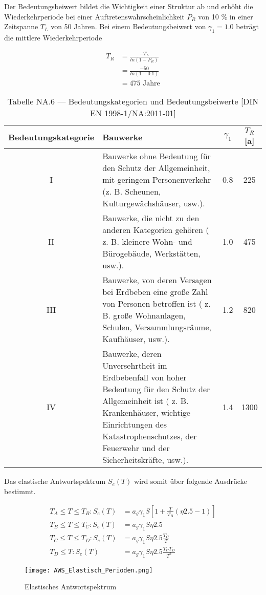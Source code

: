 \pagebreak

Der Bedeutungsbeiwert bildet die Wichtigkeit einer Struktur ab und erhöht die Wiederkehrperiode bei einer Auftretenswahrscheinlichkeit $P_R$ von 10 \% in einer Zeitspanne $T_L$ von 50 Jahren.
Bei einem Bedeutungsbeiwert von $\gamma_1 = 1.0$ beträgt die mittlere Wiederkehrperiode

\begin{align*}
T_R &= \frac{-T_L}{ln(1 - P_R)}\\
    &= \frac{-50}{ln(1 - 0.1)}\\
    &=  475 \mbox{ Jahre}
\end{align*}

\begin{table}[H]
\centering
\begin{tabular}{ |c|p{7cm}|c|c| } 
 \hline
 Bedeutungskategorie & Bauwerke & $\gamma_1$ & $T_R$ [a]\\
 \hline\hline
 I   & Bauwerke ohne Bedeutung für den Schutz der Allgemeinheit, mit geringem Personenverkehr (z. B. Scheunen, Kulturgewächshäuser, usw.). & 0.8 & 225\\
 \hline
 II  & Bauwerke, die nicht zu den anderen Kategorien gehören ( z. B. kleinere Wohn- und Bürogebäude, Werkstätten, usw.). & 1.0 & 475\\
 \hline
 III & Bauwerke, von deren Versagen bei Erdbeben eine große Zahl von Personen betroffen ist ( z. B. große Wohnanlagen, Schulen, Versammlungsräume, Kaufhäuser, usw.). & 1.2 & 820\\
 \hline
 IV  & Bauwerke, deren Unversehrtheit im Erdbebenfall von hoher Bedeutung für den Schutz der Allgemeinheit ist ( z. B. Krankenhäuser, wichtige Einrichtungen des Katastrophenschutzes, der Feuerwehr und der Sicherheitskräfte, usw.). & 1.4 & 1300\\
 \hline
\end{tabular}
\caption{Tabelle NA.6 — Bedeutungskategorien und Bedeutungsbeiwerte [DIN EN 1998-1/NA:2011-01]}
\end{table}

\pagebreak

Das elastische Antwortspektrum $S_e(T)$ wird somit über folgende Ausdrücke bestimmt.

\begin{align*}
T_A \leq T \leq T_B: S_e(T) &= a_g\gamma_1S \left[ 1+\frac{T}{T_B}(\eta2.5-1) \right] \\
T_B \leq T \leq T_C: S_e(T) &= a_g\gamma_1S\eta2.5\\
T_C \leq T \leq T_D: S_e(T) &= a_g\gamma_1S\eta2.5\frac{T_C}{T}\\
T_D \leq T: S_e(T) &= a_g\gamma_1S\eta2.5\frac{T_CT_D}{T^2}
\end{align*}

\begin{figure}[H]
    \centering
    \texttt{[image: AWS\_Elastisch\_Perioden.png]}
    \caption{Elastisches Antwortspektrum}
\end{figure}

\pagebreak
